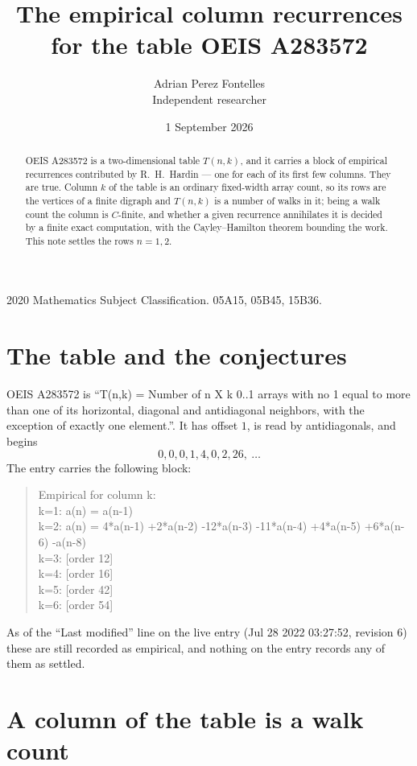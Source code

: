 \documentclass[11pt,a4paper]{article}
\title{The empirical column recurrences for the table OEIS A283572}
\author{Adrian Perez Fontelles\\ \small Independent researcher}
\date{1 September 2026}
\theoremstyle{plain}
\theoremstyle{definition}
\begin{document}
\maketitle

\begin{abstract}
OEIS A283572 is a two-dimensional table $T(n,k)$, and it carries a block of empirical
recurrences contributed by R.~H.~Hardin --- one for each of its first few columns. They are
true. Column $k$ of the table is an ordinary fixed-width array count, so its rows are the
vertices of a finite digraph and $T(n,k)$ is a number of walks in it; being a walk count the
column is $C$-finite, and whether a given recurrence annihilates it is decided by a finite
exact computation, with the Cayley--Hamilton theorem bounding the work. This note settles the rows $n=1, 2$.
\end{abstract}

\noindent\small 2020 Mathematics Subject Classification. 05A15, 05B45, 15B36.\normalsize

\section{The table and the conjectures}

OEIS A283572 is ``T(n,k) = Number of n X k 0..1 arrays with no 1 equal to more than one of its horizontal, diagonal and antidiagonal neighbors, with the exception of exactly one element.''. It has offset $1$, is
read by antidiagonals, and begins
\[
0, 0, 0, 1, 4, 0, 2, 26,\ \dots
\]
The entry carries the following block:
\begin{quote}\small
Empirical for column k:\\
k=1: a(n) = a(n-1)\\
k=2: a(n) = 4*a(n-1) +2*a(n-2) -12*a(n-3) -11*a(n-4) +4*a(n-5) +6*a(n-6) -a(n-8)\\
k=3: [order 12]\\
k=4: [order 16]\\
k=5: [order 42]\\
k=6: [order 54]\\
\end{quote}
As of the ``Last modified'' line on the live entry (Jul 28 2022 03:27:52, revision 6) these are still
recorded as empirical, and nothing on the entry records any of them as settled.

\section{A column of the table is a walk count}
\end{document}
